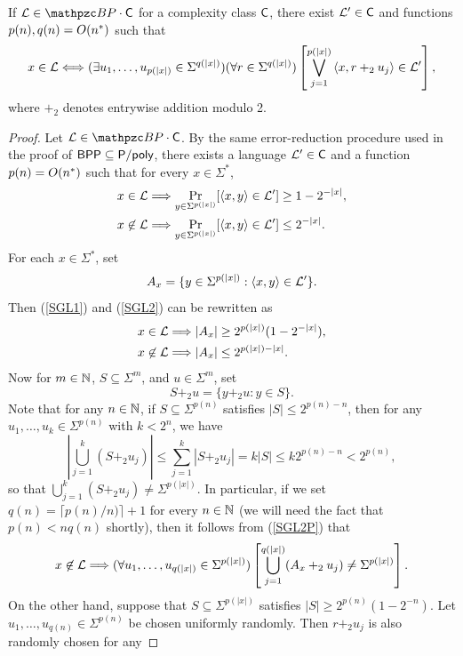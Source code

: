 \begin{theorem}
If $\cL\in\cBP\cdot\sC$ for a complexity class $\mathsf{C}$, there exist
$\mathcal{L}^\prime\in\mathsf{C}$ and functions $p(n),q(n)=O(n^*)$ such that
\[
x\in\mathcal{L}\Longleftrightarrow
(\exists u_1,\ldots, u_{p(|x|)}\in\Sigma^{q(|x|)})
(\forall r\in\Sigma^{q(|x|)})
\left[\bigvee_{j=1}^{p(|x|)}\left\langle x,r+_2u_j\right\rangle\in\mathcal{L}^\prime\right],
\]
where $+_2$ denotes entrywise addition modulo 2.
\end{theorem}
\begin{proof}
Let $\cL\in\cBP\cdot\sC$. By the same error-reduction procedure used in the
proof of $\mathsf{BPP}\subseteq\mathsf{P}/\mathsf{poly}$, there exists a language 
$\mathcal{L}^\prime\in\mathsf{C}$ and a function $p(n)=O(n^*)$ such that for every 
$x\in\Sigma^*$,
\begin{align}
\label{SGL1} x\in\mathcal{L}&\Longrightarrow
\Pr_{y\in\Sigma^{p(|x|)}}[\left\langle x,y\right\rangle\in\mathcal{L}^\prime]\geq 1-2^{-|x|}, \\ 
\label{SGL2} x\not\in\mathcal{L}&\Longrightarrow
\Pr_{y\in\Sigma^{p(|x|)}}[\left\langle x,y\right\rangle\in\mathcal{L}^\prime]\leq 2^{-|x|}. 
\end{align}
For each $x\in\Sigma^*$, set
\[
A_x=\{y\in\Sigma^{p(|x|)}:\left\langle x,y\right\rangle\in\mathcal{L}^\prime\}.
\]
Then (\ref{SGL1}) and (\ref{SGL2}) can be rewritten as
\begin{align}
\label{SGL1P} x\in\mathcal{L}&\Longrightarrow
|A_x|\geq 2^{p(|x|)}(1-2^{-|x|}), \\ 
\label{SGL2P} x\not\in\mathcal{L}&\Longrightarrow
|A_x|\leq 2^{p(|x|)-|x|}.
\end{align}
Now for $m\in\mathbb{N}$, $S\subseteq\Sigma^m$, and $u\in\Sigma^m$, set
\[
S+_2u=\{y+_2u:y\in S\}.
\]
Note that for any $n\in\mathbb{N}$, if $S\subseteq\Sigma^{p(n)}$ satisfies $|S|\leq 
2^{p(n)-n}$, then for any $u_1,\ldots,u_k\in\Sigma^{p(n)}$ with $k<2^n$, we have
\[
\left|\bigcup_{j=1}^k(S+_2u_j)\right|\leq
\sum_{j=1}^k|S+_2u_j|=k|S|\leq k2^{p(n)-n}<2^{p(n)},
\]
so that $\bigcup_{j=1}^k(S+_2u_j)\neq\Sigma^{p(|x|)}$. In particular, if we set 
$q(n)=\lceil p(n)/n)\rceil+1$ for every $n\in\mathbb{N}$ (we will need the fact that 
$p(n)<nq(n)$ shortly), then it follows from 
(\ref{SGL2P}) that
\begin{equation}\label{SGL3}
x\not\in\mathcal{L}\Longrightarrow
(\forall u_1,\ldots,u_{q(|x|)}\in\Sigma^{p(|x|)})
\left[\bigcup_{j=1}^{q(|x|)}(A_x+_2u_j)\neq\Sigma^{p(|x|)}\right].
\end{equation}
On the other hand, suppose that $S\subseteq\Sigma^{p(|x|)}$ satisfies 
$|S|\geq 2^{p(n)}(1-2^{-n})$. Let $u_1,\ldots,u_{q(n)}\in\Sigma^{p(n)}$ be 
chosen uniformly randomly. Then $r+_2u_j$ is also randomly chosen for any 

\end{proof}
